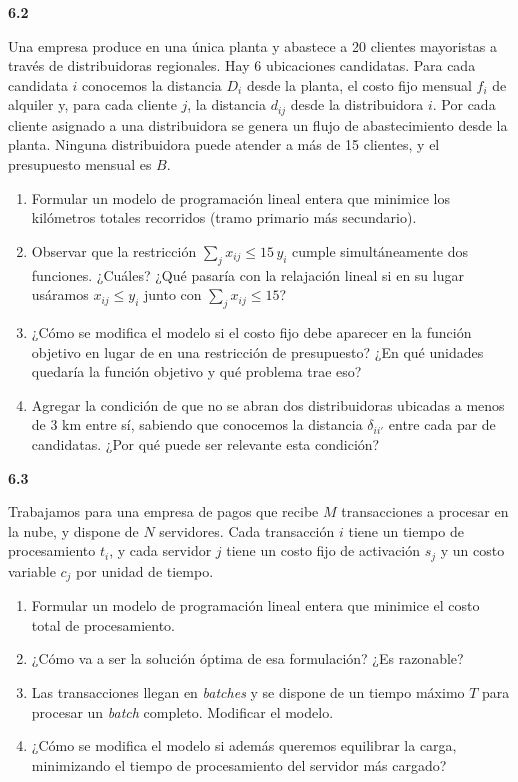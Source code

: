 \documentclass[11pt,a4paper]{article}
\newcommand{\ejercicio}[1]{\par\medskip\noindent\textbf{#1}\par\nopagebreak\smallskip}
\begin{document}
\ejercicio{6.2}
Una empresa produce en una única planta y abastece a 20 clientes mayoristas a
través de distribuidoras regionales. Hay 6 ubicaciones candidatas. Para cada
candidata $i$ conocemos la distancia $D_i$ desde la planta, el costo fijo
mensual $f_i$ de alquiler y, para cada cliente $j$, la distancia $d_{ij}$ desde
la distribuidora $i$. Por cada cliente asignado a una distribuidora se genera un
flujo de abastecimiento desde la planta. Ninguna distribuidora puede atender a
más de 15 clientes, y el presupuesto mensual es $B$.
\begin{enumerate}
  \item Formular un modelo de programación lineal entera que minimice los
  kilómetros totales recorridos (tramo primario más secundario).
  \item Observar que la restricción $\sum_j x_{ij} \le 15\, y_i$ cumple
  simultáneamente dos funciones. ¿Cuáles? ¿Qué pasaría con la relajación lineal
  si en su lugar usáramos $x_{ij} \le y_i$ junto con $\sum_j x_{ij} \le 15$?
  \item ¿Cómo se modifica el modelo si el costo fijo debe aparecer en la función
  objetivo en lugar de en una restricción de presupuesto? ¿En qué unidades
  quedaría la función objetivo y qué problema trae eso?
  \item Agregar la condición de que no se abran dos distribuidoras ubicadas a
  menos de 3 km entre sí, sabiendo que conocemos la distancia $\delta_{ii'}$
  entre cada par de candidatas. ¿Por qué puede ser relevante esta condición?
\end{enumerate}

\ejercicio{6.3}
Trabajamos para una empresa de pagos que recibe $M$ transacciones a procesar en
la nube, y dispone de $N$ servidores. Cada transacción $i$ tiene un tiempo de
procesamiento $t_i$, y cada servidor $j$ tiene un costo fijo de activación $s_j$
y un costo variable $c_j$ por unidad de tiempo.
\begin{enumerate}
  \item Formular un modelo de programación lineal entera que minimice el costo
  total de procesamiento.
  \item ¿Cómo va a ser la solución óptima de esa formulación? ¿Es razonable?
  \item Las transacciones llegan en \emph{batches} y se dispone de un tiempo
  máximo $T$ para procesar un \emph{batch} completo. Modificar el modelo.
  \item ¿Cómo se modifica el modelo si además queremos equilibrar la carga,
  minimizando el tiempo de procesamiento del servidor más cargado?
\end{enumerate}
\end{document}
